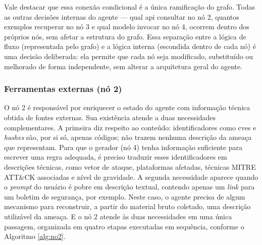 Vale destacar que essa conexão condicional é a única ramificação do grafo. 
Todas as outras decisões internas do agente --- qual \gls{api} consultar no nó 2, quantos exemplos recuperar no nó 3 e qual modelo invocar no nó 4, ocorrem dentro dos próprios nós, sem afetar a estrutura do grafo. 
Essa separação entre a lógica de fluxo (representada pelo grafo) e a lógica interna (escondida dentro de cada nó) é uma decisão deliberada: ela permite que cada nó seja modificado, substituído ou melhorado de forma independente, sem alterar a arquitetura geral do agente.


\subsubsection{Ferramentas externas (nó 2)}

O nó 2 é responsável por enriquecer o estado do agente com informação técnica obtida de fontes externas. 
Sua existência atende a duas necessidades complementares. 
A primeira diz respeito ao conteúdo: identificadores como \gls{cve}s e \textit{hashes} são, por si só, apenas códigos; não trazem nenhuma descrição da ameaça que representam. 
Para que o gerador (nó 4) tenha informação suficiente para escrever uma regra adequada, é preciso traduzir esses identificadores em descrições técnicas, como vetor de ataque, plataformas afetadas, técnicas MITRE ATT\&CK associadas e nível de gravidade. 
A segunda necessidade aparece quando o \textit{prompt} do usuário é pobre em descrição textual, contendo apenas um \textit{link} para um boletim de segurança, por exemplo. 
Neste caso, o agente precisa de algum mecanismo para reconstruir, a partir do material bruto coletado, uma descrição utilizável da ameaça. 
E o nó 2 atende às duas necessidades em uma única passagem, organizada em quatro etapas executadas em sequência, conforme o Algoritmo \ref{alg:no2}.

